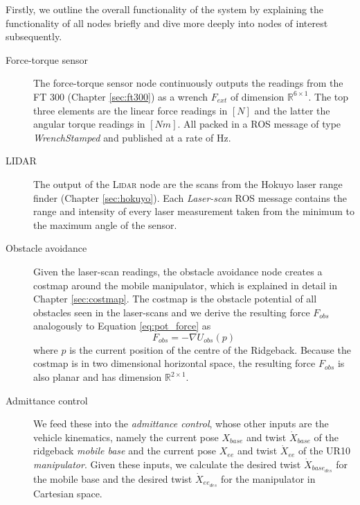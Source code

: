 Firstly, we outline the overall functionality of the system by explaining the functionality of all nodes briefly and dive more deeply into nodes of interest subsequently.

\begin{description}
  \item[Force-torque sensor] The force-torque sensor node continuously outputs the readings from the FT 300 (Chapter \ref{sec:ft300}) as a wrench $F_{ext}$ of dimension $\mathbb{R}^{6 \times 1}$. The top three elements are the linear force readings in $[N]$ and the latter the angular torque readings in $[Nm]$. All packed in a ROS message of type \emph{WrenchStamped} \citep{rosWrench} and published at a rate of \unit[100]{Hz}. 

  \item[LIDAR] The output of the \textsc{Lidar} node are the scans from the Hokuyo laser range finder (Chapter \ref{sec:hokuyo}). Each \emph{Laser-scan} ROS message \citep{rosLaserscan} contains the range and intensity of every laser measurement taken from the minimum to the maximum angle of the sensor.
  
  \item[Obstacle avoidance] Given the laser-scan readings, the obstacle avoidance node creates a costmap \citep{rosCostmap} around the mobile manipulator, which is explained in detail in Chapter \ref{sec:costmap}. The costmap is the obstacle potential of all obstacles seen in the laser-scans and we derive the resulting force $F_{obs}$ analogously to Equation \ref{eq:pot_force} as
  \begin{equation}
  F_{obs} = - \nabla U_{obs}(p)
  \end{equation}
  where $p$ is the current position of the centre of the Ridgeback. Because the costmap is in two dimensional horizontal space, the resulting force $F_{obs}$ is also planar and has dimension $\mathbb{R}^{2 \times 1}$. 
  
  \item[Admittance control] We feed these into the \emph{admittance control}, whose other inputs are the vehicle kinematics, namely the current pose $X_{base}$ \citep{rosPose} and twist $\dot{X}_{base}$ \citep{rosTwist} of the ridgeback \emph{mobile base} and the current pose $X_{ee}$ and twist $\dot{X}_{ee}$ of the UR10 \emph{manipulator}. Given these inputs, we calculate the desired twist $\dot{X}_{base_{des}}$ for the mobile base and the desired twist $\dot{X}_{ee_{des}}$ for the manipulator in Cartesian space.
  

\end{description}

